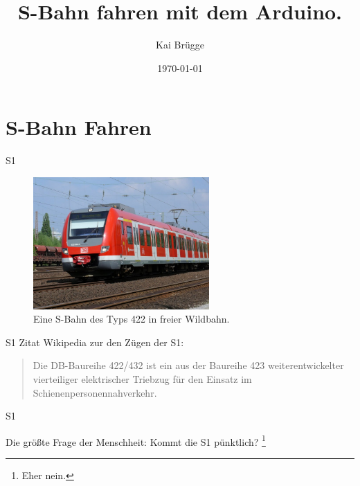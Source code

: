 \documentclass{beamer}
\title{S-Bahn fahren mit dem Arduino.}
\date{\today}
\author{Kai Brügge} \institute{TU Dortmund, Physik E5b, Astroteilchenphysik}
\begin{document}
\maketitle

\section{S-Bahn Fahren}

\begin{frame}[fragile]{S1}
  \begin{figure}[ht]
    \centering
      \includegraphics[width=0.6\textwidth]{pics/s1.jpg}
      \caption{Eine S-Bahn des Typs 422 in freier Wildbahn. }
      \label{fig:s1}
  \end{figure}
\end{frame}


\begin{frame}[fragile]{S1}
  Zitat Wikipedia zur den Zügen der S1:
  \begin{quote}
    Die DB-Baureihe 422/432 ist ein aus der Baureihe 423 weiterentwickelter vierteiliger elektrischer Triebzug für den Einsatz im Schienenpersonennahverkehr.
  \end{quote}
\end{frame}

\begin{frame}[fragile]{S1}
\begin{alertblock}{Die größte Frage der Menschheit: }
  Kommt die S1 pünktlich? \footnote{Eher nein.}
\end{alertblock}
\end{frame}
\end{document}
